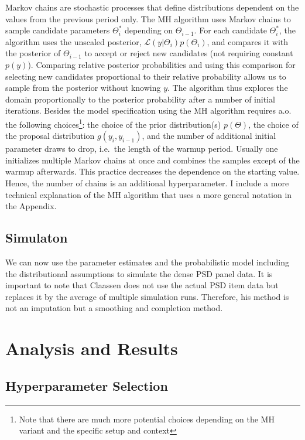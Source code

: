 \documentclass[12pt,english,a4paper,oneside]{article}
\theoremstyle{definition}
\theoremstyle{definition}
\theoremstyle{definition}
\theoremstyle{definition}
\theoremstyle{remark}
\begin{document}
Markov chains are stochastic processes that define distributions dependent on the values from the previous period only. The MH algorithm uses Markov chains to sample candidate parameters \(\Theta_i^*\) depending on \(\Theta_{i-1}\). For each candidate \(\Theta_i^*\), the algorithm uses the unscaled posterior, \(\mathcal{L}(y|\Theta_i)p(\Theta_i)\), and compares it with the posterior of \(\Theta_{i-1}\) to accept or reject new candidates (not requiring constant \(p(y)\)). Comparing relative posterior probabilities and using this comparison for selecting new candidates proportional to their relative probability allows us to sample from the posterior without knowing \(y\). The algorithm thus explores the domain proportionally to the posterior probability after a number of initial iterations. Besides the model specification using the MH algorithm requires a.o. the following choices\footnote{Note that there are much more potential choices depending on the MH variant and the specific setup and context}: the choice of the prior distribution(s) \(p(\Theta)\), the choice of the proposal distribution \(g(y_i, y_{i-1})\), and the number of additional initial parameter draws to drop, i.e.~the length of the warmup period. Usually one initializes multiple Markov chains at once and combines the samples except of the warmup afterwards. This practice decreases the dependence on the starting value. Hence, the number of chains is an additional hyperparameter. I include a more technical explanation of the MH algorithm that uses a more general notation in the Appendix.

\hypertarget{simulaton}{%
\subsection{Simulaton}\label{simulaton}}

We can now use the parameter estimates and the probabilistic model including the distributional assumptions to simulate the dense PSD panel data. It is important to note that Claassen does not use the actual PSD item data but replaces it by the average of multiple simulation runs. Therefore, his method is not an imputation but a smoothing and completion method.

\hypertarget{analysis-and-results}{%
\section{Analysis and Results}\label{analysis-and-results}}

\hypertarget{hyperparameter-selection}{%
\subsection{Hyperparameter Selection}\label{hyperparameter-selection}}
\end{document}
